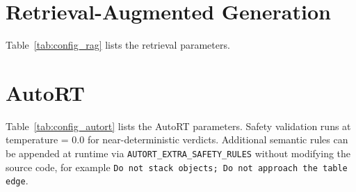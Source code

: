 \documentclass[
     12pt,
     a4paper,
     BCOR=10mm,
     DIV=14,
     listof=totoc,
     bibliography=totoc,
     parskip,
     twoside,
     headsepline
     ]{scrreprt}
\begin{document}
\section{Retrieval-Augmented Generation}\label{appendix:config:rag}
Table~\ref{tab:config_rag} lists the retrieval parameters.

\begin{table}[ht]
	\centering
	\caption{\gls{rag} system configuration parameters.}
	\label{tab:config_rag}
\end{table}

\section{AutoRT}\label{appendix:config:autort}
Table~\ref{tab:config_autort} lists the AutoRT parameters. Safety validation runs at temperature = 0.0 for near-deterministic verdicts. Additional semantic rules can be appended at runtime via \texttt{AUTORT\_EXTRA\_SAFETY\_RULES} without modifying the source code, for example \texttt{Do not stack objects; Do not approach the table edge}.
\end{document}
